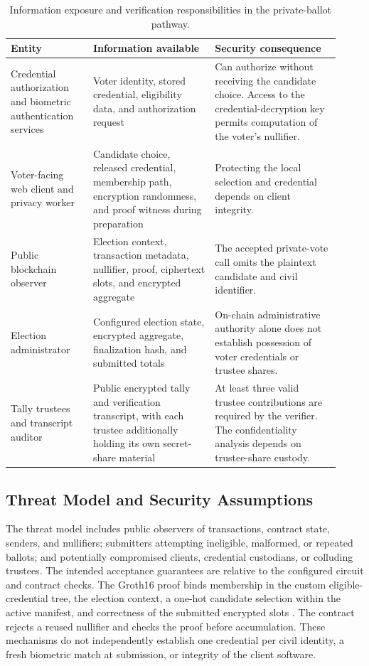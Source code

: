 \begin{table}[t]
\centering
\caption{Information exposure and verification responsibilities in the private-ballot pathway.}
\label{tab:system-visibility}
\small
\begin{tabular}{@{}p{0.23\linewidth}p{0.34\linewidth}p{0.35\linewidth}@{}}
\toprule
\textbf{Entity} & \textbf{Information available} & \textbf{Security consequence} \\
\midrule
Credential authorization and biometric authentication services
& Voter identity, stored credential, eligibility data, and authorization request
& Can authorize without receiving the candidate choice. Access to the credential-decryption key permits computation of the voter's nullifier. \\
\addlinespace
Voter-facing web client and privacy worker
& Candidate choice, released credential, membership path, encryption randomness, and proof witness during preparation
& Protecting the local selection and credential depends on client integrity. \\
\addlinespace
Public blockchain observer
& Election context, transaction metadata, nullifier, proof, ciphertext slots, and encrypted aggregate
& The accepted private-vote call omits the plaintext candidate and civil identifier. \\
\addlinespace
Election administrator
& Configured election state, encrypted aggregate, finalization hash, and submitted totals
& On-chain administrative authority alone does not establish possession of voter credentials or trustee shares. \\
\addlinespace
Tally trustees and transcript auditor
& Public encrypted tally and verification transcript, with each trustee additionally holding its own secret-share material
& At least three valid trustee contributions are required by the verifier. The confidentiality analysis depends on trustee-share custody. \\
\bottomrule
\end{tabular}
\end{table}

\subsection{Threat Model and Security Assumptions}
\label{subsec:system-security-objectives}

The threat model includes public observers of transactions, contract state,
senders, and nullifiers; submitters attempting ineligible, malformed, or repeated
ballots; and potentially compromised clients, credential custodians, or colluding
trustees. The intended acceptance guarantees are relative to the configured circuit
and contract checks. The Groth16 proof binds membership in the custom
eligible-credential tree, the election context, a one-hot candidate selection
within the active manifest, and correctness of the submitted encrypted slots
\citep{groth2016snark}. The contract rejects a reused nullifier and checks the
proof before accumulation. These mechanisms do not independently establish one
credential per civil identity, a fresh biometric match at submission, or integrity
of the client software.

